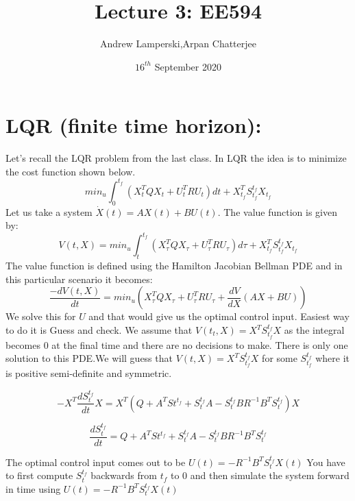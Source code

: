 \documentclass{article}
\title{Lecture 3: EE594}
\author{{Andrew Lamperski},{Arpan Chatterjee}}
\date{$16^{th}$  September 2020}
\begin{document}
\maketitle

\section{LQR (finite time horizon):}
Let's recall the LQR problem from the last class. In LQR the idea is to minimize the cost function shown below.
\begin{equation}
    min_{u}  \int_{0}^{t_{f}} (X_{t}^T Q X_{t} + U_{t}^T R U_{t}) dt  + X_{t_{f}}^T S_{t_{f}}^{t_{f}} X_{t_{f}} 
\end{equation}
Let us take a system $\dot X(t) = AX(t) +BU(t)$. The value function is given by:
\begin{equation}
    V(t,X) = min_{u}  \int_{t}^{t_{f}} (X_{\tau}^T Q X_{\tau} + U_{\tau}^T R U_{\tau}) d\tau  + X_{t_{f}}^T S_{t_{f}}^{t_{f}} X_{t_{f}}
\end{equation}
The value function is defined using the Hamilton Jacobian Bellman PDE and in this particular scenario it becomes: 
\begin{equation}
    \frac{-dV(t,X)}{dt} = min_{u} (X_{\tau}^T Q X_{\tau} + U_{\tau}^T R U_{\tau}  + \frac{dV}{dX}(AX+BU))
\end{equation}
We solve this for $U$ and that would give us the optimal control input. Easiest way to do it is Guess and check. We assume that $V(t_{t},X)= X^{T}S_{t_{f}}^{t_{f}}X$ as the integral becomes 0 at the final time and there are no decisions to make. There is only one solution to this PDE.We will guess that $V(t,X)= X^{T}S_{t_{f}}^{t_{f}}X$ for some $S_{t_{f}}^{t_{f}}$ where it is positive semi-definite and symmetric.

\begin{equation}
    -X^{T}\frac{d S_{t}^{t_{f}}}{dt}X = X^{T}(Q+ A^{T}S{t}^{t_{f}} + S_{t}^{t_{f}}A - S_{t}^{t_{f}}BR^{-1}B^{T}S_{t}^{t_{f}})X
\end{equation}
    
\begin{equation}
     \frac{d S_{t}^{t_{f}}}{dt} = Q+ A^{T}S{t}^{t_{f}} + S_{t}^{t_{f}}A - S_{t}^{t_{f}}BR^{-1}B^{T}S_{t}^{t_{f}}
\end{equation}

The optimal control input comes out to be $U(t) = -R^{-1}B^{T}S_{t}^{t_{f}}X(t)$
You have to first compute $S_{t}^{t_{f}}$ backwards from $t_{f}$ to 0 and then simulate the system forward in time using $U(t) = -R^{-1}B^{T}S_{t}^{t_{f}}X(t)$
\end{document}
